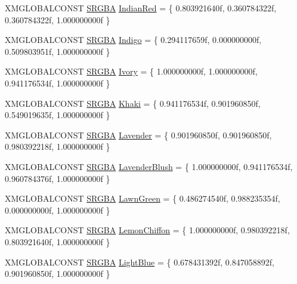 \begin{DoxyCompactItemize}
\item 
X\+M\+G\+L\+O\+B\+A\+L\+C\+O\+N\+ST \hyperlink{structmage_1_1_s_r_g_b_a}{S\+R\+G\+BA} \hyperlink{namespacemage_1_1color_ae55d6dafecdd3658cc65030c36378ce6}{Indian\+Red} = \{ 0.\+803921640f, 0.\+360784322f, 0.\+360784322f, 1.\+000000000f \}
\item 
X\+M\+G\+L\+O\+B\+A\+L\+C\+O\+N\+ST \hyperlink{structmage_1_1_s_r_g_b_a}{S\+R\+G\+BA} \hyperlink{namespacemage_1_1color_a9d61e8b1a66949fcc413c1234094ac66}{Indigo} = \{ 0.\+294117659f, 0.\+000000000f, 0.\+509803951f, 1.\+000000000f \}
\item 
X\+M\+G\+L\+O\+B\+A\+L\+C\+O\+N\+ST \hyperlink{structmage_1_1_s_r_g_b_a}{S\+R\+G\+BA} \hyperlink{namespacemage_1_1color_a98e545acecca320d52ee5d84aa915945}{Ivory} = \{ 1.\+000000000f, 1.\+000000000f, 0.\+941176534f, 1.\+000000000f \}
\item 
X\+M\+G\+L\+O\+B\+A\+L\+C\+O\+N\+ST \hyperlink{structmage_1_1_s_r_g_b_a}{S\+R\+G\+BA} \hyperlink{namespacemage_1_1color_a8c155ae2fa38902ee22618992b09506d}{Khaki} = \{ 0.\+941176534f, 0.\+901960850f, 0.\+549019635f, 1.\+000000000f \}
\item 
X\+M\+G\+L\+O\+B\+A\+L\+C\+O\+N\+ST \hyperlink{structmage_1_1_s_r_g_b_a}{S\+R\+G\+BA} \hyperlink{namespacemage_1_1color_a5ee2564ff75f8064a1f908a11ed3f2c8}{Lavender} = \{ 0.\+901960850f, 0.\+901960850f, 0.\+980392218f, 1.\+000000000f \}
\item 
X\+M\+G\+L\+O\+B\+A\+L\+C\+O\+N\+ST \hyperlink{structmage_1_1_s_r_g_b_a}{S\+R\+G\+BA} \hyperlink{namespacemage_1_1color_a22195ffe66fa883105d4371f4b28af6f}{Lavender\+Blush} = \{ 1.\+000000000f, 0.\+941176534f, 0.\+960784376f, 1.\+000000000f \}
\item 
X\+M\+G\+L\+O\+B\+A\+L\+C\+O\+N\+ST \hyperlink{structmage_1_1_s_r_g_b_a}{S\+R\+G\+BA} \hyperlink{namespacemage_1_1color_aae914716f3218cd8c3558c4970577309}{Lawn\+Green} = \{ 0.\+486274540f, 0.\+988235354f, 0.\+000000000f, 1.\+000000000f \}
\item 
X\+M\+G\+L\+O\+B\+A\+L\+C\+O\+N\+ST \hyperlink{structmage_1_1_s_r_g_b_a}{S\+R\+G\+BA} \hyperlink{namespacemage_1_1color_ad82a9c74c0196ac3fd75e20260dd299d}{Lemon\+Chiffon} = \{ 1.\+000000000f, 0.\+980392218f, 0.\+803921640f, 1.\+000000000f \}
\item 
X\+M\+G\+L\+O\+B\+A\+L\+C\+O\+N\+ST \hyperlink{structmage_1_1_s_r_g_b_a}{S\+R\+G\+BA} \hyperlink{namespacemage_1_1color_ad873e37317c9f28a1133b46f15feba17}{Light\+Blue} = \{ 0.\+678431392f, 0.\+847058892f, 0.\+901960850f, 1.\+000000000f \}
\item 

\end{DoxyCompactItemize}
